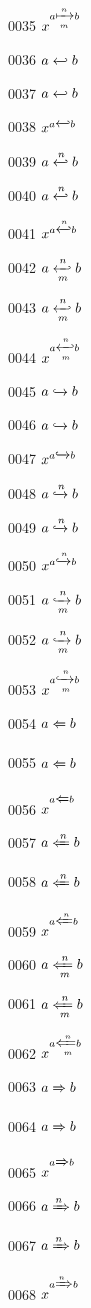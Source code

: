 \documentclass{article}
\begin{document}
0035 $x^{a\xmapsto[m]{n}b}$\par
0036 $a\xhookleftarrow{}b$\par
0037 $\displaystyle a\xhookleftarrow{}b$\par
0038 $x^{a\xhookleftarrow{}b}$\par
0039 $a\xhookleftarrow{n}b$\par
0040 $\displaystyle a\xhookleftarrow{n}b$\par
0041 $x^{a\xhookleftarrow{n}b}$\par
0042 $a\xhookleftarrow[m]{n}b$\par
0043 $\displaystyle a\xhookleftarrow[m]{n}b$\par
0044 $x^{a\xhookleftarrow[m]{n}b}$\par
0045 $a\xhookrightarrow{}b$\par
0046 $\displaystyle a\xhookrightarrow{}b$\par
0047 $x^{a\xhookrightarrow{}b}$\par
0048 $a\xhookrightarrow{n}b$\par
0049 $\displaystyle a\xhookrightarrow{n}b$\par
0050 $x^{a\xhookrightarrow{n}b}$\par
0051 $a\xhookrightarrow[m]{n}b$\par
0052 $\displaystyle a\xhookrightarrow[m]{n}b$\par
0053 $x^{a\xhookrightarrow[m]{n}b}$\par
0054 $a\xLeftarrow{}b$\par
0055 $\displaystyle a\xLeftarrow{}b$\par
0056 $x^{a\xLeftarrow{}b}$\par
0057 $a\xLeftarrow{n}b$\par
0058 $\displaystyle a\xLeftarrow{n}b$\par
0059 $x^{a\xLeftarrow{n}b}$\par
0060 $a\xLeftarrow[m]{n}b$\par
0061 $\displaystyle a\xLeftarrow[m]{n}b$\par
0062 $x^{a\xLeftarrow[m]{n}b}$\par
0063 $a\xRightarrow{}b$\par
0064 $\displaystyle a\xRightarrow{}b$\par
0065 $x^{a\xRightarrow{}b}$\par
0066 $a\xRightarrow{n}b$\par
0067 $\displaystyle a\xRightarrow{n}b$\par
0068 $x^{a\xRightarrow{n}b}$\par
\end{document}
